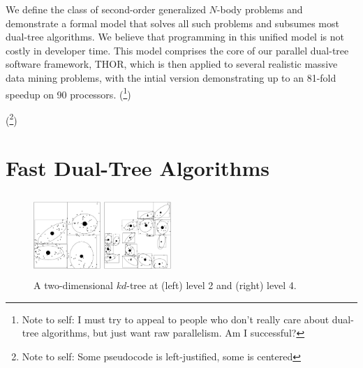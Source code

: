 \documentclass[twoside,leqno,twocolumn]{article}
\newcommand{\authornote}[1]{(\footnote{Note to self: #1})}
\newcommand{\authorsnote}[1]{\authornote{#1}}
\begin{document}

We define the class of second-order generalized $N$-body problems and demonstrate a formal model that solves all such problems and subsumes most dual-tree algorithms.
We believe that programming in this unified model is not costly in developer time.
This model comprises the core of our parallel dual-tree software framework, THOR, which is then applied to several realistic massive data mining problems, with the intial version demonstrating up to an 81-fold speedup on 90 processors.
\authorsnote{I must try to appeal to people who don't really care about dual-tree algorithms, but just want raw parallelism.  Am I successful?}

\authorsnote{Some pseudocode is left-justified, some is centered}

\section{Fast Dual-Tree Algorithms}

\begin{figure}[t]
  \centering
  \begin{minipage}{3.2in}
    \begin{minipage}{1.05in}
      \includegraphics[width=1.0in,height=1.2in]{kdtree-level2.ps}
    \end{minipage}
    \begin{minipage}{1.05in}
      \includegraphics[width=1.0in,height=1.2in]{kdtree-level4.ps}
    \end{minipage}
    \begin{minipage}{1.0in}
      \footnotesize{\caption{\label{fig:kdtree} A two-dimensional
          $kd$-tree at (left) level 2 and (right) level 4.}}
    \end{minipage}
  \end{minipage}
\end{figure}
\end{document}
